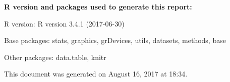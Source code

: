 \documentclass[11pt, a4paper,twoside]{report}\usepackage[]{graphicx}\usepackage[]{color}
\newcommand{\prog}[1]{\textsf{#1}}
\begin{document}
\newpage



\newpage
{}


%

\vfill

\footnotesize

{\bf \prog{R} version and packages used to generate this report:}

\prog{R} version: \textsf{R version 3.4.1 (2017-06-30)}

Base packages: \textsf{stats, graphics, grDevices, utils, datasets, methods, base}

Other packages: \textsf{data.table, knitr}

This document was generated on August 16, 2017 at 18:34.
\end{document}
